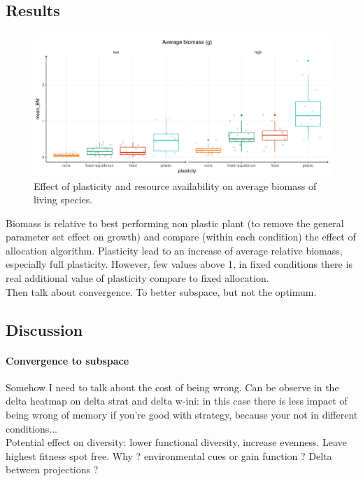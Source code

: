 \subsection{Results}


\begin{figure}\label{fig:w_ini_p_as_r}
\includegraphics[width = \textwidth]{./2_PP/Figures/plot_BM_allocation.pdf}
\caption{Effect of plasticity and resource availability on average biomass of living species.}
\end{figure}
Biomass is relative to best performing non plastic plant (to remove the general parameter set effect on growth) and compare (within each condition) the effect of allocation algorithm. Plasticity lead to an increase of average relative biomass, especially full plasticity. However, few values above 1, in fixed conditions there is real additional value of plasticity compare to fixed allocation.\\

Then talk about convergence. To better subspace, but not the optimum.

\subsection{Discussion}

\paragraph{Convergence to subspace}

Somehow I need to talk about the cost of being wrong. Can be observe in the delta heatmap on delta strat and delta w-ini: in this case there is less impact of being wrong of memory if you're good with strategy, because your not in different conditions...\\

Potential effect on diversity: lower functional diversity, increase evenness. Leave highest fitness spot free. Why ? environmental cues or gain function ? Delta between projections ? \\

